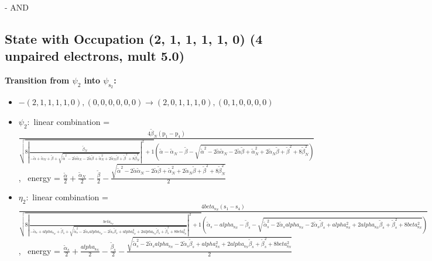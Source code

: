 \documentclass[12pt,a4paper]{article}
\begin{document}
 -  AND 
\subsection*{State with Occupation (2, 1, 1, 1, 1, 0) (4 unpaired electrons, mult 5.0)}
        \noindent\textbf{Transition from $\psi_{2}$ into $\psi_{\text{s}_{2}}$:}
        \begin{itemize}
            \item $- (2, 1, 1, 1, 1, 0), (0, 0, 0, 0, 0, 0) \rightarrow (2, 0, 1, 1, 1, 0), (0, 1, 0, 0, 0, 0)$
        
            \item $\psi_{2}:$ linear combination = $\frac{4 \tilde{\beta}_{N} \left(\text{p}_{1} - \text{p}_{4}\right)}{\sqrt{8 \left|{\frac{\tilde{\beta}_{N}}{- \tilde{\alpha} + \tilde{\alpha}_{N} + \tilde{\beta} + \sqrt{\tilde{\alpha}^{2} - 2 \tilde{\alpha} \tilde{\alpha}_{N} - 2 \tilde{\alpha} \tilde{\beta} + \tilde{\alpha}_{N}^{2} + 2 \tilde{\alpha}_{N} \tilde{\beta} + \tilde{\beta}^{2} + 8 \tilde{\beta}_{N}^{2}}}}\right|^{2} + 1} \left(\tilde{\alpha} - \tilde{\alpha}_{N} - \tilde{\beta} - \sqrt{\tilde{\alpha}^{2} - 2 \tilde{\alpha} \tilde{\alpha}_{N} - 2 \tilde{\alpha} \tilde{\beta} + \tilde{\alpha}_{N}^{2} + 2 \tilde{\alpha}_{N} \tilde{\beta} + \tilde{\beta}^{2} + 8 \tilde{\beta}_{N}^{2}}\right)}$, \
            energy = $\frac{\tilde{\alpha}}{2} + \frac{\tilde{\alpha}_{N}}{2} - \frac{\tilde{\beta}}{2} - \frac{\sqrt{\tilde{\alpha}^{2} - 2 \tilde{\alpha} \tilde{\alpha}_{N} - 2 \tilde{\alpha} \tilde{\beta} + \tilde{\alpha}_{N}^{2} + 2 \tilde{\alpha}_{N} \tilde{\beta} + \tilde{\beta}^{2} + 8 \tilde{\beta}_{N}^{2}}}{2}$
            
            \item $\eta_{2}:$ linear combination = $\frac{4 beta_{\text{s}_N} \left(\text{s}_{1} - \text{s}_{4}\right)}{\sqrt{8 \left|{\frac{beta_{\text{s}_N}}{- \tilde{\alpha}_{s} + alpha_{\text{s}_N} + \tilde{\beta}_{s} + \sqrt{\tilde{\alpha}_{s}^{2} - 2 \tilde{\alpha}_{s} alpha_{\text{s}_N} - 2 \tilde{\alpha}_{s} \tilde{\beta}_{s} + alpha_{\text{s}_N}^{2} + 2 alpha_{\text{s}_N} \tilde{\beta}_{s} + \tilde{\beta}_{s}^{2} + 8 beta_{\text{s}_N}^{2}}}}\right|^{2} + 1} \left(\tilde{\alpha}_{s} - alpha_{\text{s}_N} - \tilde{\beta}_{s} - \sqrt{\tilde{\alpha}_{s}^{2} - 2 \tilde{\alpha}_{s} alpha_{\text{s}_N} - 2 \tilde{\alpha}_{s} \tilde{\beta}_{s} + alpha_{\text{s}_N}^{2} + 2 alpha_{\text{s}_N} \tilde{\beta}_{s} + \tilde{\beta}_{s}^{2} + 8 beta_{\text{s}_N}^{2}}\right)}$, \
            energy = $\frac{\tilde{\alpha}_{s}}{2} + \frac{alpha_{\text{s}_N}}{2} - \frac{\tilde{\beta}_{s}}{2} - \frac{\sqrt{\tilde{\alpha}_{s}^{2} - 2 \tilde{\alpha}_{s} alpha_{\text{s}_N} - 2 \tilde{\alpha}_{s} \tilde{\beta}_{s} + alpha_{\text{s}_N}^{2} + 2 alpha_{\text{s}_N} \tilde{\beta}_{s} + \tilde{\beta}_{s}^{2} + 8 beta_{\text{s}_N}^{2}}}{2}$
            

\end{itemize}
\end{document}
